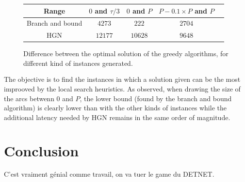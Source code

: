 \documentclass[english]{article}
\begin{document}
\begin{center}
\begin{figure}
\centering
\begin{tabular}{ |c|c|c|c|c| }
\hline
    Range & $0$ and $\tau/3$ & $0$ and $P$& $P-0.1\times P$ and $P$\\
    \hline
    Branch and bound & $4273$ & $222$& $2704$ \\
 
    HGN & $12177$ & $10628$& $9648$\\
   
    \hline
  
 \end{tabular} 
 \caption{Difference between the optimal solution of the greedy algorithms, for different kind of instances generated.}
 \label{tab:instances}
 \end{figure}
 \end{center}
 The objective is to find the instances in which a solution given can be the most improoved by the local search heuristics. As observed, when drawing the size of the arcs betwenn $0$ and $P$, the lower bound (found by the branch and bound algorithm) is clearly lower than with the other kinds of instances while the additional latency needed by HGN remains in the same order of magnitude.
 
\section{Conclusion}
C'est vraiment génial comme travail, on va tuer le game du DETNET.



\end{document}
